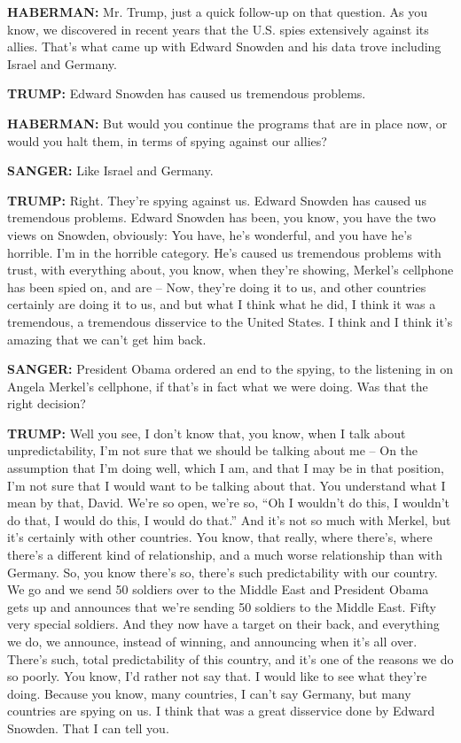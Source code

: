 \textbf{HABERMAN:} Mr. Trump, just a quick follow-up on that question.
As you know, we discovered in recent years that the U.S. spies
extensively against its allies. That's what came up with Edward Snowden
and his data trove including Israel and Germany.

\textbf{TRUMP:} Edward Snowden has caused us tremendous problems.

\textbf{HABERMAN:} But would you continue the programs that are in place
now, or would you halt them, in terms of spying against our allies?

\textbf{SANGER:} Like Israel and Germany.

\textbf{TRUMP:} Right. They're spying against us. Edward Snowden has
caused us tremendous problems. Edward Snowden has been, you know, you
have the two views on Snowden, obviously: You have, he's wonderful, and
you have he's horrible. I'm in the horrible category. He's caused us
tremendous problems with trust, with everything about, you know, when
they're showing, Merkel's cellphone has been spied on, and are -- Now,
they're doing it to us, and other countries certainly are doing it to
us, and but what I think what he did, I think it was a tremendous, a
tremendous disservice to the United States. I think and I think it's
amazing that we can't get him back.

\textbf{SANGER:} President Obama ordered an end to the spying, to the
listening in on Angela Merkel's cellphone, if that's in fact what we
were doing. Was that the right decision?

\textbf{TRUMP:} Well you see, I don't know that, you know, when I talk
about unpredictability, I'm not sure that we should be talking about me
-- On the assumption that I'm doing well, which I am, and that I may be
in that position, I'm not sure that I would want to be talking about
that. You understand what I mean by that, David. We're so open, we're
so, ``Oh I wouldn't do this, I wouldn't do that, I would do this, I
would do that.'' And it's not so much with Merkel, but it's certainly
with other countries. You know, that really, where there's, where
there's a different kind of relationship, and a much worse relationship
than with Germany. So, you know there's so, there's such predictability
with our country. We go and we send 50 soldiers over to the Middle East
and President Obama gets up and announces that we're sending 50 soldiers
to the Middle East. Fifty very special soldiers. And they now have a
target on their back, and everything we do, we announce, instead of
winning, and announcing when it's all over. There's such, total
predictability of this country, and it's one of the reasons we do so
poorly. You know, I'd rather not say that. I would like to see what
they're doing. Because you know, many countries, I can't say Germany,
but many countries are spying on us. I think that was a great disservice
done by Edward Snowden. That I can tell you.

